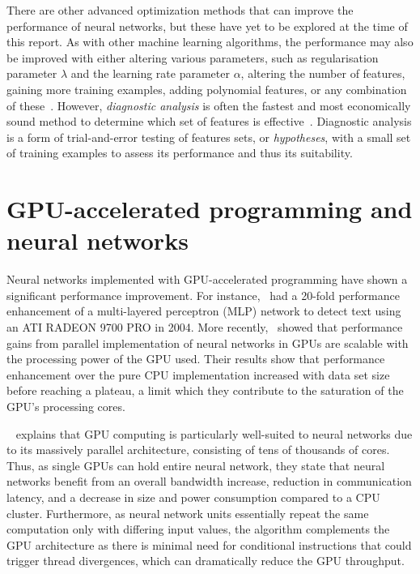 There are other advanced optimization methods that can improve the performance of neural networks, but these have yet to be explored at the time of this report. As with other machine learning algorithms, the performance may also be improved with either altering various parameters, such as regularisation parameter $\lambda$ and the learning rate parameter $\alpha$, altering the number of features, gaining more training examples, adding polynomial features, or any combination of these~\cite{Ng12}. However, \textit{diagnostic analysis} is often the fastest and most economically sound method to determine which set of features is effective~\cite{Ng12}. Diagnostic analysis is a form of trial-and-error testing of features sets, or \textit{hypotheses}, with a small set of training examples to assess its performance and thus its suitability.

\section{GPU-accelerated programming and neural networks}\label{se:gpu}

Neural networks implemented with GPU-accelerated programming have shown a significant performance improvement. For instance,~\cite{OhJun04} had a 20-fold performance enhancement of a multi-layered perceptron (MLP) network to detect text using an ATI RADEON 9700 PRO in 2004. More recently,~\cite{GurFor13} showed that performance gains from parallel implementation of neural networks in GPUs are scalable with the processing power of the GPU used. Their results show that performance enhancement over the pure CPU implementation increased with data set size before reaching a plateau, a limit which they contribute to the saturation of the GPU's processing cores.

~\cite{Nvi14} explains that GPU computing is particularly well-suited to neural networks due to its massively parallel architecture, consisting of tens of thousands of cores. Thus, as single GPUs can hold entire neural network, they state that neural networks benefit from an overall bandwidth increase, reduction in communication latency, and a decrease in size and power consumption compared to a CPU cluster. Furthermore, as neural network units essentially repeat the same computation only with differing input values, the algorithm complements the GPU architecture as there is minimal need for conditional instructions that could trigger thread divergences, which can dramatically reduce the GPU throughput.

